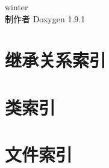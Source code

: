 \let\mypdfximage\pdfximage\def\pdfximage{\immediate\mypdfximage}\documentclass[twoside]{book}
\newcommand{\+}{\discretionary{\mbox{\scriptsize$\hookleftarrow$}}{}{}}
\newcommand{\clearemptydoublepage}{%
  \newpage{\pagestyle{empty}\cleardoublepage}%
}
\begin{document}
\raggedbottom
\begin{CJK}{UTF8}{min}

\begin{titlepage}
\vspace*{7cm}
\begin{center}%
{\Large winter }\\
\vspace*{1cm}
{\large 制作者 Doxygen 1.9.1}\\
\end{center}
\end{titlepage}
\clearemptydoublepage
{}
\tableofcontents
\clearemptydoublepage
{}

\chapter{继承关系索引}

\chapter{类索引}

\chapter{文件索引}


\end{CJK}
\end{document}
